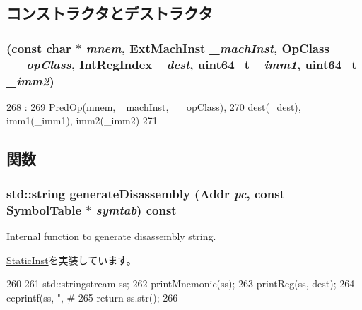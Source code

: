 \subsection{コンストラクタとデストラクタ}
\hypertarget{classRegImmImmOp_a7b25d52adf1128abfb4080ae20595e60}{
\subsubsection[{RegImmImmOp}]{ (const char $\ast$ {\em mnem}, \/  {\bf ExtMachInst} {\em \_\-machInst}, \/  OpClass {\em \_\-\_\-opClass}, \/  {\bf IntRegIndex} {\em \_\-dest}, \/  uint64\_\-t {\em \_\-imm1}, \/  uint64\_\-t {\em \_\-imm2})}}
\label{classRegImmImmOp_a7b25d52adf1128abfb4080ae20595e60}



\begin{DoxyCode}
268                                                                    :
269         PredOp(mnem, _machInst, __opClass),
270         dest(_dest), imm1(_imm1), imm2(_imm2)
271     {}

\end{DoxyCode}


\subsection{関数}
\hypertarget{classRegImmImmOp_a95d323a22a5f07e14d6b4c9385a91896}{
\subsubsection[{generateDisassembly}]{\setlength{\rightskip}{0pt plus 5cm}std::string generateDisassembly ({\bf Addr} {\em pc}, \/  const SymbolTable $\ast$ {\em symtab}) const}}
\label{classRegImmImmOp_a95d323a22a5f07e14d6b4c9385a91896}
Internal function to generate disassembly string. 

\hyperlink{classStaticInst_ab4a569d2623620c04f8a52bbd91d63b9}{StaticInst}を実装しています。


\begin{DoxyCode}
260 {
261     std::stringstream ss;
262     printMnemonic(ss);
263     printReg(ss, dest);
264     ccprintf(ss, ", #%
265     return ss.str();
266 }
\end{DoxyCode}


